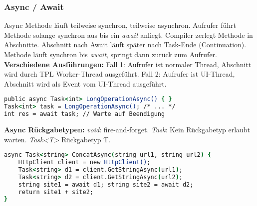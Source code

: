 \subsubsection{Async / Await}
Async Methode läuft teilweise synchron, teilweise asynchron.
Aufrufer führt Methode solange synchron aus bis ein \textit{await} anliegt.
Compiler zerlegt Methode in Abschnitte. Abschnitt nach Await läuft später nach Task-Ende (Continuation).
Methode läuft synchron bis \textit{await}, springt dann zurück zum Aufrufer.\\ 
\textbf{Verschiedene Ausführungen:} Fall 1: Aufrufer ist normaler Thread, Abschnitt wird durch TPL Worker-Thread ausgeführt.
Fall 2: Aufrufer ist UI-Thread, Abschnitt wird als Event vom UI-Thread ausgeführt.
\begin{lstlisting}[language=csh]
public async Task<int> LongOperationAsync() { }
Task<int> task = LongOperationAsync(); /* ... */
int res = await task; // Warte auf Beendigung
\end{lstlisting}
\textbf{Async Rückgabetypen:}
\textit{void}: fire-and-forget.
\textit{Task}: Kein Rückgabetyp erlaubt warten.
\textit{Task\textless T\textgreater} Rückgabetyp T.
\begin{lstlisting}[language=csh]
async Task<string> ConcatAsync(string url1, string url2) {
    HttpClient client = new HttpClient();
    Task<string> d1 = client.GetStringAsync(url1);
    Task<string> d2 = client.GetStringAsync(url2);
    string site1 = await d1; string site2 = await d2;
    return site1 + site2;
}
\end{lstlisting}